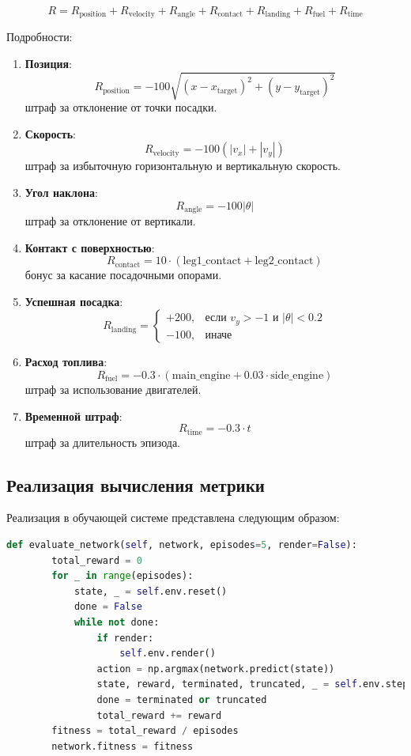 \documentclass[a4paper,12pt]{article}
\begin{document}
\[
R = R_{\text{position}} + R_{\text{velocity}} + R_{\text{angle}} + R_{\text{contact}} + R_{\text{landing}} + R_{\text{fuel}} + R_{\text{time}}
\]

Подробности:

\begin{enumerate}
    \item \textbf{Позиция}:
    \[
    R_{\text{position}} = -100 \sqrt{(x - x_{\text{target}})^2 + (y - y_{\text{target}})^2}
    \]
    штраф за отклонение от точки посадки.

    \item \textbf{Скорость}:
    \[
    R_{\text{velocity}} = -100 \left( |v_x| + |v_y| \right)
    \]
    штраф за избыточную горизонтальную и вертикальную скорость.

    \item \textbf{Угол наклона}:
    \[
    R_{\text{angle}} = -100 |\theta|
    \]
    штраф за отклонение от вертикали.

    \item \textbf{Контакт с поверхностью}:
    \[
    R_{\text{contact}} = 10 \cdot (\text{leg1\_contact} + \text{leg2\_contact})
    \]
    бонус за касание посадочными опорами.

    \item \textbf{Успешная посадка}:
    \[
    R_{\text{landing}} = 
    \begin{cases}
        +200, & \text{если } v_y > -1 \text{ и } |\theta| < 0.2 \\
        -100, & \text{иначе}
    \end{cases}
    \]

    \item \textbf{Расход топлива}:
    \[
    R_{\text{fuel}} = -0.3 \cdot (\text{main\_engine} + 0.03 \cdot \text{side\_engine})
    \]
    штраф за использование двигателей.

    \item \textbf{Временной штраф}:
    \[
    R_{\text{time}} = -0.3 \cdot t
    \]
    штраф за длительность эпизода.
\end{enumerate}

\subsection{Реализация вычисления метрики}
Реализация в обучающей системе представлена следующим образом:

\begin{lstlisting}[language=Python]
def evaluate_network(self, network, episodes=5, render=False):
        total_reward = 0
        for _ in range(episodes):
            state, _ = self.env.reset()
            done = False
            while not done:
                if render:
                    self.env.render()
                action = np.argmax(network.predict(state))
                state, reward, terminated, truncated, _ = self.env.step(action)
                done = terminated or truncated
                total_reward += reward
        fitness = total_reward / episodes
        network.fitness = fitness
\end{lstlisting}
\end{document}

